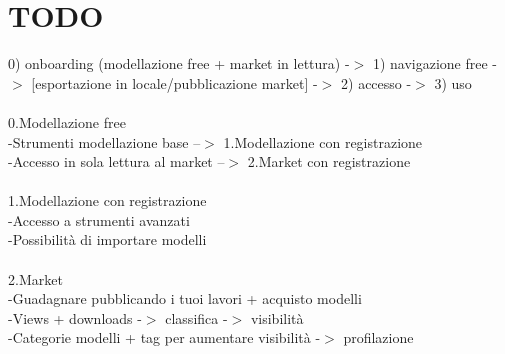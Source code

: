 \documentclass[a4paper, twoside]{article}
\begin{document}
\section{TODO}

0) onboarding (modellazione free + market in lettura) -$>$ 1) navigazione free -$>$  [esportazione in locale/pubblicazione market] -$>$  2) accesso -$>$ 3) uso\\\\


0.Modellazione free\\
-Strumenti modellazione base		--$>$ 	1.Modellazione con registrazione\\				
-Accesso in sola lettura al market	--$>$ 	2.Market con registrazione\\\\

1.Modellazione con registrazione\\
-Accesso a strumenti avanzati \\
-Possibilità di importare modelli\\\\

2.Market\\
-Guadagnare pubblicando i tuoi lavori + acquisto modelli \\
-Views + downloads  -$>$  classifica  -$>$  visibilità\\
-Categorie modelli + tag per aumentare visibilità  -$>$  profilazione\\
\end{document}
